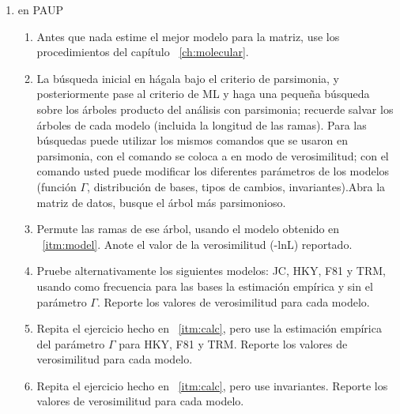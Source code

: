 \begin{enumerate}
\item{en PAUP}
	\begin{enumerate}
		\item \label{itm:model} Antes que nada estime el mejor modelo para la matriz, use los procedimientos del cap\'itulo ~\ref{ch:molecular}. 

		
		\item \label{itm:calc} La b\'usqueda inicial en  h\'agala bajo el criterio de parsimonia, y posteriormente pase al criterio de ML y haga una \textrm{peque\~na} b\'usqueda sobre los \'arboles producto del an\'alisis con parsimonia; recuerde salvar los \'arboles de cada modelo (incluida la longitud de las ramas). Para las b\'usquedas puede utilizar los mismos comandos que se usaron en parsimonia, con el comando  se coloca a  en modo de verosimilitud; con el comando  usted puede modificar los diferentes par\'ametros de los modelos (funci\'on $\Gamma$, distribuci\'on de bases, tipos de cambios, invariantes).Abra la matriz de datos, busque el \'arbol m\'as parsimonioso.
		\item Permute las ramas de ese \'arbol, usando el modelo obtenido en ~\ref{itm:model}. Anote el valor de la verosimilitud (-lnL) reportado.
		\item  Pruebe alternativamente los siguientes modelos: JC, HKY, F81 y TRM, usando como frecuencia para las bases la estimaci\'on emp\'irica y sin el par\'ametro $\Gamma$. Reporte los valores de verosimilitud para cada modelo.



		\item Repita el ejercicio hecho en ~\ref{itm:calc}, pero use la estimaci\'on emp\'irica del par\'ametro $\Gamma$ para HKY, F81 y TRM. Reporte los valores de verosimilitud para cada modelo.
		
		\item Repita el ejercicio hecho en ~\ref{itm:calc}, pero use invariantes. Reporte los valores de verosimilitud para cada modelo.
		
	\end{enumerate}


\end{enumerate}
